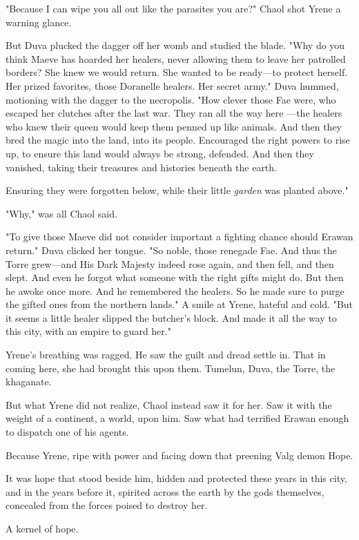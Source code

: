"Because I can wipe you all out like the parasites you are?" Chaol shot Yrene a warning glance.

But Duva plucked the dagger off her womb and studied the blade. "Why do you think Maeve has hoarded her healers, never allowing them to leave her patrolled borders? She knew we would return. She wanted to be ready---to protect herself. Her prized favorites, those Doranelle healers. Her secret army." Duva hummed, motioning with the dagger to the necropolis. "How clever those Fae were, who escaped her clutches after the last war. They ran all the way here ---the healers who knew their queen would keep them penned up like animals. And then they bred the magic into the land, into its people. Encouraged the right powers to rise up, to ensure this land would always be strong, defended. And then they vanished, taking their treasures and histories beneath the earth.

Ensuring they were forgotten below, while their little \emph{garden} was planted above."

"Why," was all Chaol said.

"To give those Maeve did not consider important a fighting chance should Erawan return." Duva clicked her tongue. "So noble, those renegade Fae. And thus the Torre grew---and His Dark Majesty indeed rose again, and then fell, and then slept. And even he forgot what someone with the right gifts might do. But then he awoke once more. And he remembered the healers. So he made sure to purge the gifted ones from the northern lands." A smile at Yrene, hateful and cold. "But it seems a little healer slipped the butcher's block. And made it all the way to this city, with an empire to guard her."

Yrene's breathing was ragged. He saw the guilt and dread settle in. That in coming here, she had brought this upon them. Tumelun, Duva, the Torre, the khaganate.

But what Yrene did not realize, Chaol instead saw it for her. Saw it with the weight of a continent, a world, upon him. Saw what had terrified Erawan enough to dispatch one of his agents.

Because Yrene, ripe with power and facing down that preening Valg demon
 Hope.

It was hope that stood beside him, hidden and protected these years in this city, and in the years before it, spirited across the earth by the gods themselves, concealed from the forces poised to destroy her.

A kernel of hope.

